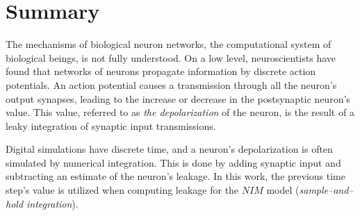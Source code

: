 
% 		
%










\section{Summary}

The mechanisms of biological neuron networks, the computational system of biological beings, is not fully understood.
On a low level, neuroscientists have found that networks of neurons propagate information by discrete action potentials.
An action potential causes a transmission through all the neuron's output synapses, leading to the increase or decrease in the postsynaptic neuron's value.
This value, referred  to as \emph{the depolarization} of the neuron, is the result of a leaky integration of synaptic input transmissions.

Digital simulations have discrete time, and a neuron's depolarization is often simulated by numerical integration.
This is done by adding synaptic input and subtracting an estimate of the neuron's leakage.
In this work, the previous time step's value is utilized when computing leakage for the $NIM$ model (\emph{sample--and--hold integration}). %

